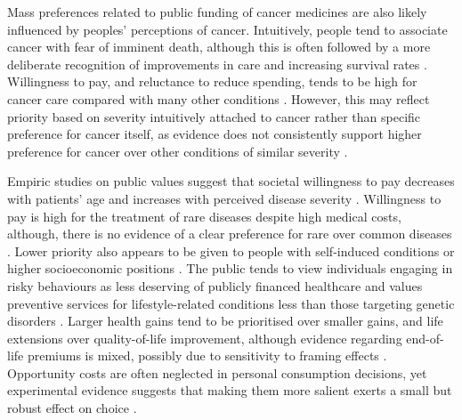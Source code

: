 \documentclass[11pt]{article}\usepackage[]{graphicx}\usepackage[]{xcolor}
\begin{document}
Mass preferences related to public funding of cancer medicines are also likely influenced by peoples’ perceptions of cancer. Intuitively, people tend to associate cancer with fear of imminent death, although this is often followed by a more deliberate recognition of improvements in care and increasing survival rates \parencite{Robb2014PublicPerceptionsCancer}. Willingness to pay, and reluctance to reduce spending, tends to be high for cancer care compared with many other conditions \parencite{Morrell2017PublicPreferHealthGainCancer, Schomerus2006PreferencesCutbacks}. However, this may reflect priority based on severity intuitively attached to cancer rather than specific preference for cancer itself, as evidence does not consistently support higher preference for cancer over other conditions of similar severity \parencite{Morrell2017PublicPreferHealthGainCancer}.

Empiric studies on public values suggest that societal willingness to pay decreases with patients’ age and increases with perceived disease severity \parencite{Gu2015AttributesWeightsPrioritySetting, Loupas2026WTPperQALYSystematicReview}. Willingness to pay is high for the treatment of rare diseases despite high medical costs, although, there is no evidence of a clear preference for rare over common diseases \parencite{Gu2023RareCommonDiseases}. Lower priority also appears to be given to people with self-induced conditions or higher socioeconomic positions \parencite{Gu2015AttributesWeightsPrioritySetting, BauteBellani2025HealthcareDeservingness}. The public tends to view individuals engaging in risky behaviours as less deserving of publicly financed healthcare and values preventive services for lifestyle-related conditions less than those targeting genetic disorders \parencite{Singh2012ResponsibilityValuationHealthcare}. Larger health gains tend to be prioritised over smaller gains, and life extensions over quality-of-life improvement, although evidence regarding end-of-life premiums is mixed, possibly due to sensitivity to framing effects \parencite{Gu2015AttributesWeightsPrioritySetting, Morrell2017PublicPreferHealthGainCancer}. Opportunity costs are often neglected in personal consumption decisions, yet experimental evidence suggests that making them more salient exerts a small but robust effect on choice \parencite{Maguire2023}.
\end{document}
